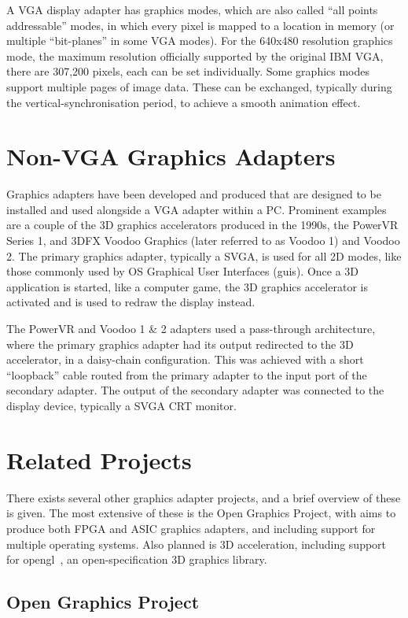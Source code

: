 A VGA display adapter has graphics modes, which are also called ``all points
addressable'' modes, in which every pixel is mapped to a location in memory (or
multiple ``bit-planes'' in some VGA modes). For the 640x480 resolution graphics
mode, the maximum resolution officially supported by the original IBM VGA, there
are 307,200 pixels, each can be set individually. Some graphics modes support
multiple pages of image data. These can be exchanged, typically during the
vertical-synchronisation period, to achieve a smooth animation effect.


\section{Non-VGA Graphics Adapters}
Graphics adapters have been developed and produced that are designed to be
installed and used alongside a VGA adapter within a PC. Prominent examples are a
couple of the 3D graphics accelerators produced in the 1990s, the PowerVR Series
1, and 3DFX Voodoo Graphics (later referred to as Voodoo 1) and Voodoo 2. The
primary graphics adapter, typically a SVGA, is used for all 2D modes, like those
commonly used by OS Graphical User Interfaces (\gls{gui}s). Once a 3D application is started,
like a computer game, the 3D graphics accelerator is activated and is used to
redraw the display instead.

The PowerVR and Voodoo 1 \& 2 adapters used a pass-through architecture, where
the primary graphics adapter had its output redirected to the 3D accelerator, in
a daisy-chain configuration. This was achieved with a short ``loopback'' cable
routed from the primary adapter to the input port of the secondary adapter. The
output of the secondary adapter was connected to the display device, typically a
SVGA CRT monitor.


\section{Related Projects}
There exists several other graphics adapter projects, and a brief overview of
these is given. The most extensive of these is the Open Graphics Project, with
aims to produce both FPGA and ASIC graphics adapters, and including support for
multiple operating systems. Also planned is 3D acceleration, including support
for \gls{opengl}~\cite{OpenGL}, an open-specification 3D graphics library.


\subsection{Open Graphics Project}

